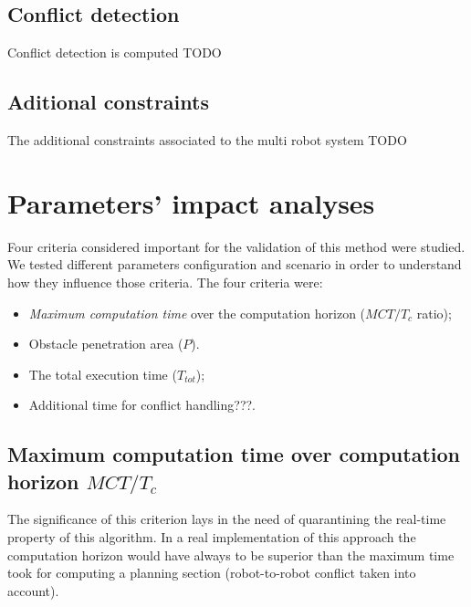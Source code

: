 \documentclass[eprint]{actapoly}
\begin{document}
\subsection{Conflict detection}

Conflict detection is computed TODO

\subsection{Aditional constraints}

The additional constraints associated to the multi robot system TODO



\section{Parameters' impact analyses}

Four criteria considered important for the validation of this method were 
studied.
We tested different parameters configuration and scenario in order to 
understand how they influence
those criteria.
The four criteria were:

\begin{itemize}

\item
\textit{Maximum computation time} over the computation horizon ($MCT/T_c$ 
ratio);

\item
Obstacle penetration area ($P$).

\item
The total execution time ($T_{tot}$);


\item
Additional time for conflict handling???.

\end{itemize}

\subsection{Maximum computation time over computation horizon $MCT/T_c$}

The significance of this criterion lays in the need of quarantining the 
real-time property of this algorithm.
In a real implementation of this approach the computation horizon would have 
always to be superior than the
maximum time took for computing a planning section (robot-to-robot conflict 
taken into account).
\end{document}
